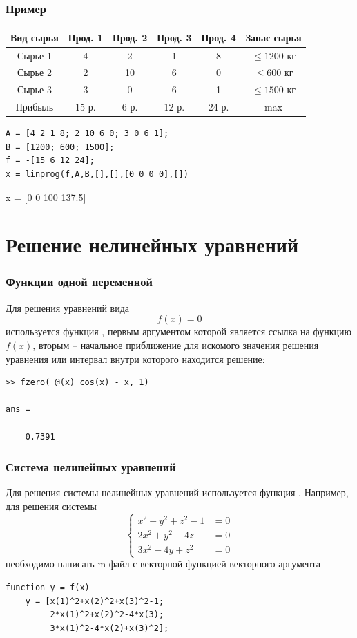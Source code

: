 \documentclass[11pt, compress]{beamer}
\begin{document}
\begin{frame}[c,fragile]\frametitle{Пример}
\begin{tabular}{c|c|c|c|c|c}
Вид сырья & Прод. 1 & Прод. 2 & Прод. 3 & Прод. 4 & Запас сырья \\
\hline
Сырье 1 & 4 & 2 & 1 & 8 & $\leq1200$ кг \\
Сырье 2 & 2 & 10 & 6 & 0 & $\leq600$ кг \\
Сырье 3 & 3 & 0 & 6 & 1 & $\leq1500$ кг \\
Прибыль & 15 р. & 6 р. & 12 р. & 24 р. & max \\
\end{tabular}
\vspace{5mm}
\begin{lstlisting}
A = [4 2 1 8; 2 10 6 0; 3 0 6 1];
B = [1200; 600; 1500];
f = -[15 6 12 24];
x = linprog(f,A,B,[],[],[0 0 0 0],[])
\end{lstlisting}
x = [0 0 100 137.5]
\end{frame}

\section{Решение нелинейных уравнений}

\begin{frame}[fragile]
\frametitle{Функции одной переменной}
Для решения уравнений вида
$$
	f(x) = 0
$$    
используется функция , первым аргументом которой является ссылка на функцию $f(x)$, вторым -- начальное приближение для искомого значения решения уравнения или интервал внутри которого находится решение:
\begin{lstlisting}
>> fzero( @(x) cos(x) - x, 1)

ans =

    0.7391
\end{lstlisting} 
\end{frame}

\begin{frame}[fragile]
\frametitle{Система нелинейных уравнений}
Для решения системы нелинейных уравнений используется функция . Например, для решения системы 
$$
	\left\{
	\begin{aligned}
	x^2 + y^2 + z^2 - 1 & = 0 \\ 
	2x^2 + y^2 - 4z  & = 0 \\ 
	3x^2 - 4y + z^2  & = 0 
	\end{aligned}
	\right.
$$
необходимо написать m-файл с векторной функцией векторного аргумента
\begin{lstlisting}
function y = f(x)
    y = [x(1)^2+x(2)^2+x(3)^2-1;
         2*x(1)^2+x(2)^2-4*x(3);
         3*x(1)^2-4*x(2)+x(3)^2];
\end{lstlisting}    
\end{frame}
\end{document}
